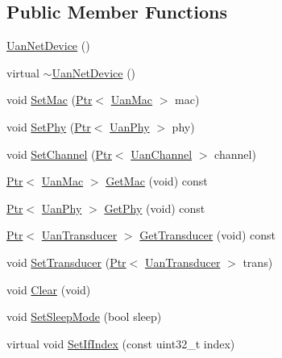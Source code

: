 \subsection*{Public Member Functions}
\begin{DoxyCompactItemize}
\item 
\hyperlink{classns3_1_1UanNetDevice_a3347d13fb75cee52d72ed5713fe90278}{Uan\+Net\+Device} ()
\item 
virtual \hyperlink{classns3_1_1UanNetDevice_ae3975db51c8c4096f7fa7765a29dae0f}{$\sim$\+Uan\+Net\+Device} ()
\item 
void \hyperlink{classns3_1_1UanNetDevice_a7225cfda064ecc308e224eb1b11397b5}{Set\+Mac} (\hyperlink{classns3_1_1Ptr}{Ptr}$<$ \hyperlink{classns3_1_1UanMac}{Uan\+Mac} $>$ mac)
\item 
void \hyperlink{classns3_1_1UanNetDevice_af6d039ecff08a8f794738fd62956f917}{Set\+Phy} (\hyperlink{classns3_1_1Ptr}{Ptr}$<$ \hyperlink{classns3_1_1UanPhy}{Uan\+Phy} $>$ phy)
\item 
void \hyperlink{classns3_1_1UanNetDevice_a987daa8c043146fad8975cb43fbb24e5}{Set\+Channel} (\hyperlink{classns3_1_1Ptr}{Ptr}$<$ \hyperlink{classns3_1_1UanChannel}{Uan\+Channel} $>$ channel)
\item 
\hyperlink{classns3_1_1Ptr}{Ptr}$<$ \hyperlink{classns3_1_1UanMac}{Uan\+Mac} $>$ \hyperlink{classns3_1_1UanNetDevice_adb4ad57f640b285d238687713c9826b3}{Get\+Mac} (void) const 
\item 
\hyperlink{classns3_1_1Ptr}{Ptr}$<$ \hyperlink{classns3_1_1UanPhy}{Uan\+Phy} $>$ \hyperlink{classns3_1_1UanNetDevice_abff3efdff8f4c31c2bb0ea780a6b99a8}{Get\+Phy} (void) const 
\item 
\hyperlink{classns3_1_1Ptr}{Ptr}$<$ \hyperlink{classns3_1_1UanTransducer}{Uan\+Transducer} $>$ \hyperlink{classns3_1_1UanNetDevice_a28fd8d3e52558859abd0757f48e8d478}{Get\+Transducer} (void) const 
\item 
void \hyperlink{classns3_1_1UanNetDevice_ad91b46a001ee99241d7579800f93eab5}{Set\+Transducer} (\hyperlink{classns3_1_1Ptr}{Ptr}$<$ \hyperlink{classns3_1_1UanTransducer}{Uan\+Transducer} $>$ trans)
\item 
void \hyperlink{classns3_1_1UanNetDevice_a06bccd3e7a4db7ea5d65819301d267dc}{Clear} (void)
\item 
void \hyperlink{classns3_1_1UanNetDevice_a933871471c1026cb15486a156648f7a8}{Set\+Sleep\+Mode} (bool sleep)
\item 
virtual void \hyperlink{classns3_1_1UanNetDevice_a2d877f8da3c474bc75f5c41049e06cac}{Set\+If\+Index} (const uint32\+\_\+t index)

\end{DoxyCompactItemize}
